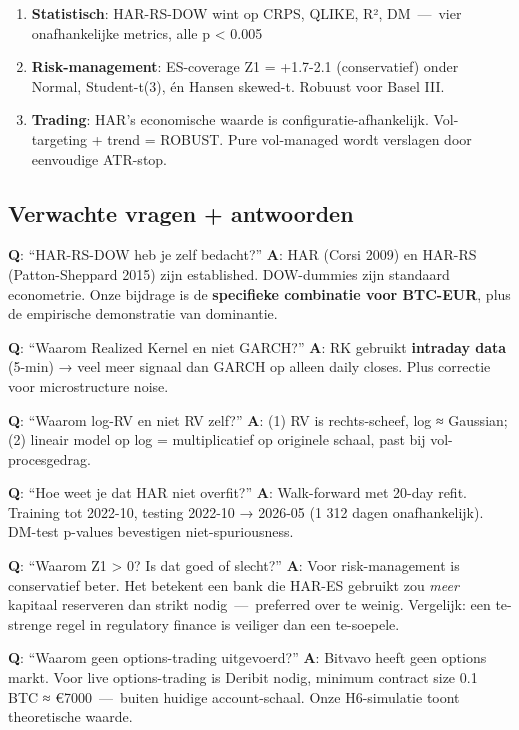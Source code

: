 \documentclass[11pt,a4paper]{article}
\begin{document}
\begin{enumerate}
\def\labelenumi{\arabic{enumi}.}
\tightlist
\item
  \textbf{Statistisch}: HAR-RS-DOW wint op CRPS, QLIKE, R², DM \,---\, vier onafhankelijke metrics, alle p \textless{} 0.005
\item
  \textbf{Risk-management}: ES-coverage Z1 = +1.7-2.1 (conservatief) onder Normal, Student-t(3), én Hansen skewed-t. Robuust voor Basel III.
\item
  \textbf{Trading}: HAR's economische waarde is configuratie-afhankelijk. Vol-targeting + trend = ROBUST. Pure vol-managed wordt verslagen door eenvoudige ATR-stop.
\end{enumerate}

\hypertarget{verwachte-vragen-antwoorden}{%
\subsection{Verwachte vragen + antwoorden}\label{verwachte-vragen-antwoorden}}

\textbf{Q}: ``HAR-RS-DOW heb je zelf bedacht?''
\textbf{A}: HAR (Corsi 2009) en HAR-RS (Patton-Sheppard 2015) zijn established. DOW-dummies zijn standaard econometrie. Onze bijdrage is de \textbf{specifieke combinatie voor BTC-EUR}, plus de empirische demonstratie van dominantie.

\textbf{Q}: ``Waarom Realized Kernel en niet GARCH?''
\textbf{A}: RK gebruikt \textbf{intraday data} (5-min) → veel meer signaal dan GARCH op alleen daily closes. Plus correctie voor microstructure noise.

\textbf{Q}: ``Waarom log-RV en niet RV zelf?''
\textbf{A}: (1) RV is rechts-scheef, log ≈ Gaussian; (2) lineair model op log = multiplicatief op originele schaal, past bij vol-procesgedrag.

\textbf{Q}: ``Hoe weet je dat HAR niet overfit?''
\textbf{A}: Walk-forward met 20-day refit. Training tot 2022-10, testing 2022-10 → 2026-05 (1 312 dagen onafhankelijk). DM-test p-values bevestigen niet-spuriousness.

\textbf{Q}: ``Waarom Z1 \textgreater{} 0? Is dat goed of slecht?''
\textbf{A}: Voor risk-management is conservatief beter. Het betekent een bank die HAR-ES gebruikt zou \emph{meer} kapitaal reserveren dan strikt nodig \,---\, preferred over te weinig. Vergelijk: een te-strenge regel in regulatory finance is veiliger dan een te-soepele.

\textbf{Q}: ``Waarom geen options-trading uitgevoerd?''
\textbf{A}: Bitvavo heeft geen options markt. Voor live options-trading is Deribit nodig, minimum contract size 0.1 BTC ≈ €7000 \,---\, buiten huidige account-schaal. Onze H6-simulatie toont theoretische waarde.
\end{document}
